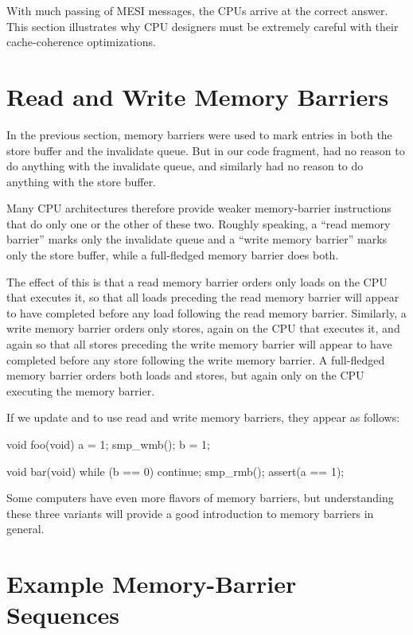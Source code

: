 With much passing of MESI messages, the CPUs arrive at the correct answer.
This section illustrates why CPU designers must be extremely careful
with their cache-coherence optimizations.

\section{Read and Write Memory Barriers}
\label{sec:app:whymb:Read and Write Memory Barriers}

In the previous section, memory barriers were used to mark entries in
both the store buffer and the invalidate queue.
But in our code fragment,  had no reason to do anything
with the invalidate queue, and  similarly had no reason
to do anything with the store buffer.

Many CPU architectures therefore provide weaker memory-barrier
instructions that do only one or the other of these two.
Roughly speaking, a ``read memory barrier'' marks only the invalidate
queue and a ``write memory barrier'' marks only the store buffer,
while a full-fledged memory barrier does both.

The effect of this is that a read memory barrier orders only loads
on the CPU that executes it, so that all loads preceding the read memory
barrier will appear to have completed before any load following the
read memory barrier.
Similarly, a write memory barrier orders
only stores, again on the CPU that executes it, and again so that
all stores preceding the write memory barrier will appear to have
completed before any store following the write memory barrier.
A full-fledged memory barrier orders both loads and stores, but again
only on the CPU executing the memory barrier.

If we update  and  to use read and write memory
barriers, they appear as follows:

\begin{VerbatimN}[fontsize=\footnotesize,samepage=true]
void foo(void)
{
	a = 1;
	smp_wmb();
	b = 1;
}

void bar(void)
{
	while (b == 0) continue;
	smp_rmb();
	assert(a == 1);
}
\end{VerbatimN}

Some computers have even more flavors of memory barriers, but
understanding these three variants will provide a good introduction
to memory barriers in general.

\section{Example Memory-Barrier Sequences}
\label{sec:app:whymb:Example Memory-Barrier Sequences}

